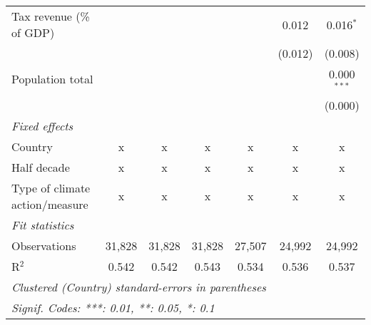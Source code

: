 \begin{tabular}{lcccccc}
   Tax revenue (\% of GDP)                            &         &         &             &              & 0.012        & 0.016$^{*}$\\   
                                                      &         &         &             &              & (0.012)      & (0.008)\\   
   Population total                                   &         &         &             &              &              & 0.000$^{***}$\\   
                                                      &         &         &             &              &              & (0.000)\\   
   \emph{Fixed effects}\\
   Country                                            & x       & x       & x           & x            & x            & x\\  
   Half decade                                        & x       & x       & x           & x            & x            & x\\  
   Type of climate action/measure                     & x       & x       & x           & x            & x            & x\\  
   \midrule \emph{Fit statistics}\\
   Observations                                       & 31,828  & 31,828  & 31,828      & 27,507       & 24,992       & 24,992\\  
   R$^2$                                              & 0.542   & 0.542   & 0.543       & 0.534        & 0.536        & 0.537\\  
   \midrule
   \multicolumn{7}{l}{\emph{Clustered (Country) standard-errors in parentheses}}\\
   \multicolumn{7}{l}{\emph{Signif. Codes: ***: 0.01, **: 0.05, *: 0.1}}\\
\end{tabular}
\par\endgroup


